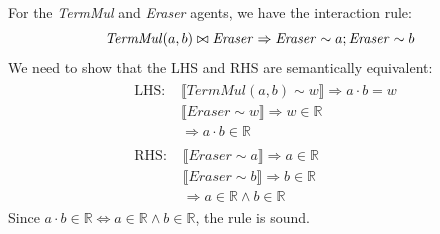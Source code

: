\begin{lemma}
	For the \textit{TermMul} and \textit{Eraser} agents, we have the interaction rule:
	$$
	\mathit{TermMul}(a, b) \bowtie \mathit{Eraser} \Rightarrow \mathit{Eraser} \sim a; \mathit{Eraser} \sim b \\
	$$
	We need to show that the LHS and RHS are semantically equivalent:
	$$
	\begin{aligned}
		& \begin{aligned}
			\text{LHS: } & \llbracket \mathit{TermMul}(a, b) \sim w \rrbracket \Rightarrow a \cdot b = w \\
			& \llbracket \mathit{Eraser} \sim w \rrbracket \Rightarrow w \in \mathbb{R} \\
			& \Rightarrow a \cdot b \in \mathbb{R}
		\end{aligned} \\
		& \begin{aligned}
			\text{RHS: } & \llbracket \mathit{Eraser} \sim a \rrbracket \Rightarrow a \in \mathbb{R} \\
			& \llbracket \mathit{Eraser} \sim b \rrbracket \Rightarrow b \in \mathbb{R} \\
			& \Rightarrow a \in \mathbb{R} \land b \in \mathbb{R}
		\end{aligned}
	\end{aligned}
	$$
	Since $a \cdot b \in \mathbb{R} \iff a \in \mathbb{R} \land b \in \mathbb{R}$, the rule is sound.
\end{lemma}

